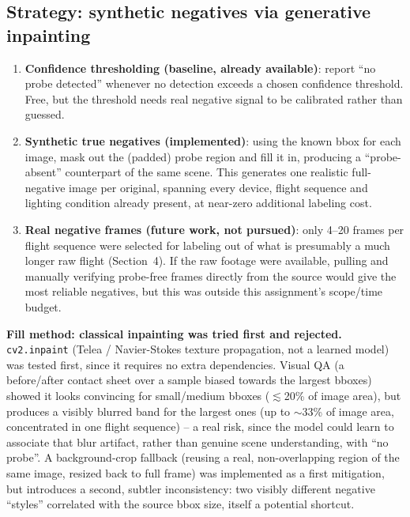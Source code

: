 \documentclass[11pt,a4paper]{article}
\begin{document}
\subsection{Strategy: synthetic negatives via generative inpainting}

\begin{enumerate}[nosep]
    \item \textbf{Confidence thresholding (baseline, already available)}: report ``no probe
          detected'' whenever no detection exceeds a chosen confidence threshold. Free, but the
          threshold needs real negative signal to be calibrated rather than guessed.
    \item \textbf{Synthetic true negatives (implemented)}: using the known bbox for each image,
          mask out the (padded) probe region and fill it in, producing a ``probe-absent''
          counterpart of the same scene. This generates one realistic full-negative image per
          original, spanning every device, flight sequence and lighting condition already
          present, at near-zero additional labeling cost.
    \item \textbf{Real negative frames (future work, not pursued)}: only 4--20 frames per flight
          sequence were selected for labeling out of what is presumably a much longer raw flight
          (Section~4). If the raw footage were available, pulling and manually verifying
          probe-free frames directly from the source would give the most reliable negatives, but
          this was outside this assignment's scope/time budget.
\end{enumerate}

\textbf{Fill method: classical inpainting was tried first and rejected.} \texttt{cv2.inpaint}
(Telea / Navier-Stokes texture propagation, not a learned model) was tested first, since it
requires no extra dependencies. Visual QA (a before/after contact sheet over a sample biased
towards the largest bboxes) showed it looks convincing for small/medium bboxes ($\lesssim$20\%
of image area), but produces a visibly blurred band for the largest ones (up to $\sim$33\% of
image area, concentrated in one flight sequence) -- a real risk, since the model could learn to
associate that blur artifact, rather than genuine scene understanding, with ``no probe''. A
background-crop fallback (reusing a real, non-overlapping region of the same image, resized back
to full frame) was implemented as a first mitigation, but introduces a second, subtler
inconsistency: two visibly different negative ``styles'' correlated with the source bbox size,
itself a potential shortcut.
\end{document}
